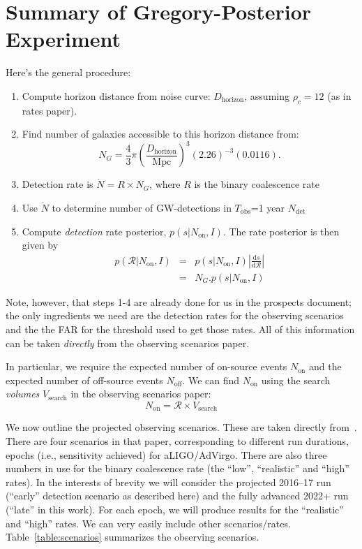 \documentclass[twocolumn,nofootinbib]{revtex4-1}
\newcommand{\cbcrate}{{{\mathcal R}}}
\newcommand{\diff}{{\mathrm d}}
\begin{document}
\section{Summary of Gregory-Posterior Experiment}
Here's the general procedure:
\begin{enumerate}
\item Compute horizon distance from noise curve: $D_{\mathrm{horizon}}$,
assuming $\rho_c=12$ (as in rates paper).
\item Find number of galaxies accessible to this horizon distance from:
\begin{equation}
N_G = \frac{4}{3} \pi \left( \frac{D_{\textrm{horizon}}}{\textrm{Mpc}}
\right)^3 (2.26)^{-3} (0.0116).
\end{equation}
\item Detection rate is $\dot{N} = R \times N_G$, where $R$ is the binary
coalescence rate
\item Use $\dot{N}$ to determine number of GW-detections in $T_{\mathrm{obs}}$=1 year
$N_{\mathrm{det}}$
\item Compute \emph{detection} rate posterior, $p(s|N_{\textrm{on}},I)$.  The
rate posterior is then given by 
\begin{eqnarray}
p(\cbcrate|N_{\textrm{on}},I) & = & p(s|N_{\textrm{on}},I) \left|\frac{\diff
s}{\diff \cbcrate}\right| \\
& = & N_G . p(s|N_{\textrm{on}},I)
\end{eqnarray}
\end{enumerate}
%
Note, however, that steps 1-4 are already done for us in the prospects document;
the only ingredients we need are the detection rates for the observing scenarios
and the the FAR for the threshold used to get those rates.  All of this
information can be taken \emph{directly} from the observing scenarios paper.

In particular, we require the expected number of on-source events
$N_{\mathrm{on}}$ and the expected number of off-source events
$N_{\mathrm{off}}$.  We can find $N_{\mathrm{on}}$ using the search
\emph{volumes} $V_{\mathrm{search}}$ in the observing scenarios paper:
%
\begin{equation}
N_{\mathrm{on}} = \cbcrate \times V_{\mathrm{search}}
\end{equation}

We now outline the projected observing scenarios.  These are taken directly
from~\cite{ade_prospects}.  There are four scenarios in that paper,
corresponding to different run durations, epochs (i.e., sensitivity achieved)
for aLIGO/AdVirgo.  There are also three numbers in use for the binary
coalescence rate (the ``low'', ``realistic'' and ``high'' rates).  In the
interests of brevity we will consider the projected 2016--17 run (``early''
detection scenario as described here) and the fully advanced 2022+ run (``late''
in this work).  For each epoch, we will produce results for the ``realistic''
and ``high'' rates.   We can very easily include other scenarios/rates.
Table~\ref{table:scenarios} summarizes the observing scenarios.
\end{document}
